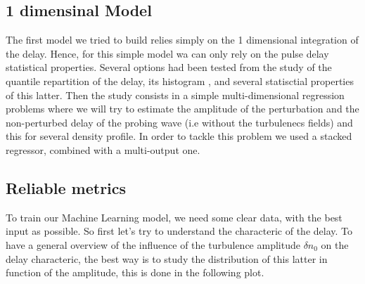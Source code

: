 \documentclass[11pt,a4paper,openany]{report}
\begin{document}
\begin{multicols}{2}
    \chapter{1 dimensinal Model}
    The first model we tried to build relies simply on the 1 dimensional integration of the delay.
    Hence, for this simple model wa can only rely on the pulse delay statistical properties. Several options had been tested from the study of the quantile repartition of the delay, its histogram , and several statisctial properties of this latter. Then the study consists in a simple multi-dimensional regression problems where we will try to estimate the amplitude of the perturbation and the non-perturbed delay of the probing wave (i.e without the turbulenecs fields) and this for several density profile. In order to tackle this problem we used a stacked regressor, combined with a multi-output one.
    \section{Reliable metrics}

    To train our Machine Learning model, we need some clear data, with the best input as possible. So first let's try to understand the characteric of the delay. To have a general overview of the influence of the turbulence amplitude $\delta n_0$ on the delay characteric, the best way is to study the distribution of this latter in function of the amplitude, this is done in the following plot.


\end{multicols}
\end{document}
